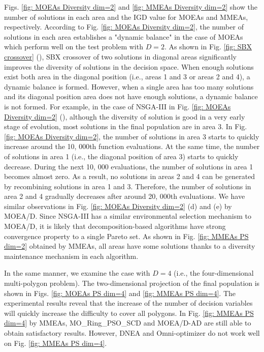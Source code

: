 \documentclass[conference]{IEEEtran}
\begin{document}
Figs. \ref{fig: MOEAs Diversity dim=2} and \ref{fig: MMEAs Diversity dim=2} show the number of solutions in each area and the IGD value for MOEAs and MMEAs, respectively. According to Fig. \ref{fig: MOEAs Diversity dim=2}, the number of solutions in each area establishes a "dynamic balance" in the case of MOEAs which perform well on the test problem with $D=2$. As shown in Fig. \ref{fig: SBX crossover} (), SBX crossover of two solutions in diagonal areas significantly improves the diversity of solutions in the decision space. When enough solutions exist both area in the diagonal position (i.e., areas 1 and 3 or areas 2 and 4), a dynamic balance is formed. However, when a single area has too many solutions and its diagonal position area does not have enough solutions, a dynamic balance is not formed. For example, in the case of NSGA-III in Fig. \ref{fig: MOEAs Diversity dim=2} (), although the diversity of solution is good in a very early stage of evolution, most solutions in the final population are in area 3. In Fig. \ref{fig: MOEAs Diversity dim=2}, the number of solutions in area 3 starts to quickly increase around the 10, 000th function evaluations. At the same time, the number of solutions in area 1 (i.e., the diagonal position of area 3) starts to quickly decrease. During the next 10, 000 evaluations, the number of solutions in area 1 becomes almost zero. As a result, no solutions in areas 2 and 4 can be generated by recombining solutions in area 1 and 3. Therefore, the number of solutions in area 2 and 4 gradually decreases after around 20, 000th evaluations. We have similar observations in Fig. \ref{fig: MOEAs Diversity dim=2} (d) and (e) by MOEA/D. Since NSGA-III has a similar environmental selection mechanism to MOEA/D, it is likely that decomposition-based algorithms have strong convergence property to a single Pareto set. As shown in Fig. \ref{fig: MMEAs PS dim=2} obtained by MMEAs, all areas have some solutions thanks to a diversity maintenance mechanism in each algorithm.

In the same manner, we examine the case with $D=4$ (i.e., the four-dimensional multi-polygon problem). The two-dimensional projection of the final population is shown in Figs. \ref{fig: MOEAs PS dim=4} and \ref{fig: MMEAs PS dim=4}. The experimental results reveal that the increase of the number of decision variables will quickly increase the difficulty to cover all polygons. In Fig. \ref{fig: MMEAs PS dim=4} by MMEAs, MO\_Ring\_PSO\_SCD and MOEA/D-AD are still able to obtain satisfactory results. However, DNEA and Omni-optimizer do not work well on Fig. \ref{fig: MMEAs PS dim=4}. 
\end{document}

